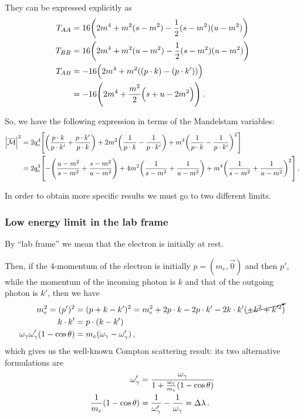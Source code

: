 \documentclass[main.tex]{subfiles}
\begin{document}
\begin{claim}
They can be expressed explicitly as 
%
\begin{align}
T_{AA} &= 16 \qty( 2 m^{4} + m^2 (s - m^2) - \frac{1}{2} (s - m^2) (u - m^2)) \\
T_{BB} &= 16 \qty( 2 m^{4} + m^2 (u - m^2) - \frac{1}{2} (s - m^2) (u - m^2)) \\
T_{AB} &= - 16 \qty( 2 m^{4} + m^2 ((p \cdot k) - (p \cdot k')))  \\
&= - 16 \qty( 2 m^{4} + \frac{m^2}{2} \qty(s + u - 2 m^2) )
\,.
\end{align}
\end{claim}

So, we have the following expression in terms of the Mandelstam variables: 
%
\begin{align}
\abs{\mathcal{\overline{M}}}^2 
&= 2 q_e^{4}  \qty[
\qty(
    \frac{p \cdot k}{p \cdot k'} +
    \frac{p \cdot k'}{p \cdot k}
)
+ 2 m^2
\qty(
    \frac{1}{p \cdot k} -
    \frac{1}{p \cdot k '} 
)
+ m^{4} 
\qty(
    \frac{1}{p \cdot k} -
    \frac{1}{p \cdot k '} 
)^2  
]\\
&=
2 q_e^{4}
\qty[
- \qty(
    \frac{u - m^2}{s - m^2} + 
    \frac{s - m^2}{u - m^2}
)
+ 4 m^2 
\qty(
    \frac{1}{s - m^2} + 
    \frac{1}{u - m^2} 
)
+ m^{4} 
\qty(
    \frac{1}{s - m^2} + 
    \frac{1}{u - m^2} 
)^2
]
\,.
\end{align}

In order to obtain more specific results we must go to two different limits. 

\subsubsection{Low energy limit in the lab frame}

By ``lab frame'' we mean that the electron is initially at rest. 

Then, if the 4-momentum of the electron is initially \(p = (m_e, \vec{0})\) and then \(p'\), while the momentum of the incoming photon is \(k\) and that of the outgoing photon is \(k'\), then we have 
%
\begin{align}
m_e^2 = (p')^2 &= (p + k - k')^2 = m_e^2 + 2 p \cdot k - 2 p \cdot k' - 2 k \cdot k' (\cancelto{}{+ k^2 + k^{\prime 2}})  \\
k \cdot k' &= p \cdot (k - k')  \\
\omega_{\gamma } \omega_{\gamma }' (1- \cos \theta ) &= m_e (\omega_{\gamma } - \omega_{\gamma }')
\,,
\end{align}
%
which gives us the well-known Compton scattering result: its two alternative formulations are 
%
\begin{align}
\omega_{\gamma }' &= \frac{\omega_{\gamma }}{1 + \frac{\omega_{\gamma }}{m_e} (1 - \cos \theta )}  \\
\frac{1}{m_e} \qty(1 - \cos \theta ) &= \frac{1}{\omega_{\gamma }'}
- \frac{1}{\omega_{\gamma }} = \Delta \lambda 
\,.
\end{align}
\end{document}
